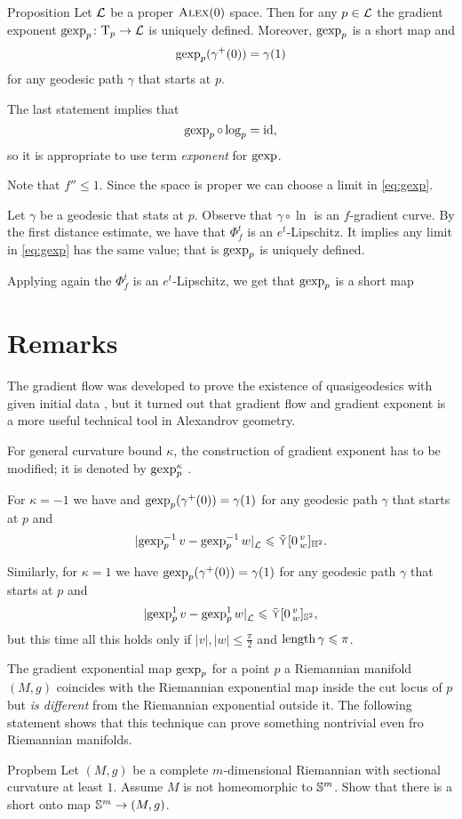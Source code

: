 \begin{thm}{Proposition}\label{prop:gexp}
Let $\mathcal{L}$ be a proper $\textsc{Alex}(0)$ space.
Then for any $p\in \mathcal{L}$ the gradient exponent $\operatorname{\rm gexp}\nolimits_p\colon\mathrm{T}_p\to\mathcal{L}$ is uniquely defined.
Moreover, $\operatorname{\rm gexp}\nolimits_p$ is a short map and 
\[\operatorname{\rm gexp}\nolimits_p(\gamma^+(0))=\gamma(1)\]
for any geodesic path $\gamma$ that starts at $p$.
\end{thm}

The last statement implies that 
\[\operatorname{\rm gexp}\nolimits_p\circ\log_p=\operatorname{\rm id}\nolimits,\]
so it is appropriate to use term \textit{exponent} for $\operatorname{\rm gexp}\nolimits$.


Note that $f''\le 1$.
Since the space is proper we can choose a limit in \ref{eq:gexp}.

Let $\gamma$ be a geodesic that stats at $p$.
Observe that $\gamma\circ\ln$ is an $f$-gradient curve.
By the first distance estimate, we have that $\Phi^t_{f}$ is an $e^t$-Lipschitz.
It implies any limit in \ref{eq:gexp} has the same value;
that is $\operatorname{\rm gexp}\nolimits_p$ is uniquely defined.

Applying again the $\Phi^t_{f}$ is an $e^t$-Lipschitz, we get that $\operatorname{\rm gexp}\nolimits_p$ is a short map
\qeds

\section{Remarks}

The gradient flow was developed to prove the existence of quasigeodesics with given initial data \cite{perelman-petrunin:qg,petrunin:qg, petrunin:survey}, but it turned out that gradient flow and gradient exponent is a more useful technical tool in Alexandrov geometry.


For general curvature bound $\kappa$, the construction of gradient exponent has to be modified;
it is denoted by $\operatorname{\rm gexp}\nolimits_p^\kappa$ \cite[16.36]{alexander-kapovitch-petrunin2024}.

For $\kappa=-1$ we have 
and $\operatorname{\rm gexp}\nolimits_p(\gamma^+(0))=\gamma(1)$
for any geodesic path $\gamma$ that starts at $p$
and 
\[\dist{\gexp_p^{-1}v}{\gexp_p^{-1}w}{\spc{L}}\le \side\hinge0vw_{\HH^2}.\]

Similarly, for $\kappa=1$ we have $\operatorname{\rm gexp}\nolimits_p(\gamma^+(0))=\gamma(1)$
for any geodesic path $\gamma$ that starts at $p$ and 
\[\dist{\gexp_p^{1}v}{\gexp_p^{1}w}{\spc{L}}\le \side\hinge0vw_{\SSS^2},\]
but this time all this holds only if $|v|,|w|\le\tfrac\pi2$ and $\mathop{\rm length}\nolimits\gamma\leqslant\pi$.

The gradient exponential map $\operatorname{\rm gexp}\nolimits_p$  for a point $p$ a Riemannian manifold $(M,g)$ coincides with the Riemannian exponential map inside the cut locus of $p$ but \emph{is different } from the  Riemannian exponential outside it.
The following statement shows that this technique can prove something nontrivial even fro Riemannian manifolds.

\begin{thm}{Propbem}
Let $(M,g)$ be a complete $m$-dimensional Riemannian with sectional curvature at least $1$.
Assume $M$ is not homeomorphic to $\mathbb{S}^m$.
Show that there is a short onto map $\mathbb{S}^m\to (M,g)$.
\end{thm}


